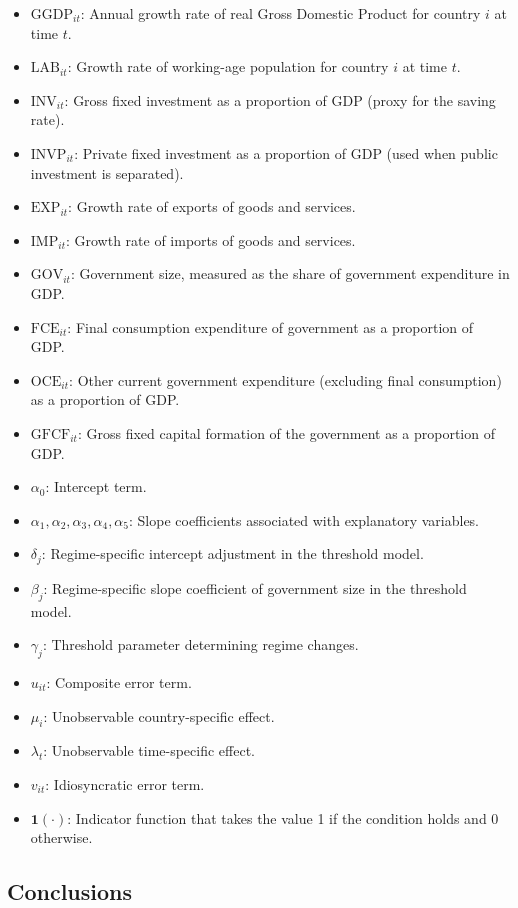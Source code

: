 \documentclass[10pt, oneside]{article}
\begin{document}
\begin{itemize}
	\item $\mathrm{GGDP}_{it}$: Annual growth rate of real Gross Domestic Product for country $i$ at time $t$.
	\item $\mathrm{LAB}_{it}$: Growth rate of working-age population for country $i$ at time $t$.
	\item $\mathrm{INV}_{it}$: Gross fixed investment as a proportion of GDP (proxy for the saving rate).
	\item $\mathrm{INVP}_{it}$: Private fixed investment as a proportion of GDP (used when public investment is separated).
	\item $\mathrm{EXP}_{it}$: Growth rate of exports of goods and services.
	\item $\mathrm{IMP}_{it}$: Growth rate of imports of goods and services.
	\item $\mathrm{GOV}_{it}$: Government size, measured as the share of government expenditure in GDP.
	\item $\mathrm{FCE}_{it}$: Final consumption expenditure of government as a proportion of GDP.
	\item $\mathrm{OCE}_{it}$: Other current government expenditure (excluding final consumption) as a proportion of GDP.
	\item $\mathrm{GFCF}_{it}$: Gross fixed capital formation of the government as a proportion of GDP.
	\item $\alpha_0$: Intercept term.
	\item $\alpha_1, \alpha_2, \alpha_3, \alpha_4, \alpha_5$: Slope coefficients associated with explanatory variables.
	\item $\delta_j$: Regime-specific intercept adjustment in the threshold model.
	\item $\beta_j$: Regime-specific slope coefficient of government size in the threshold model.
	\item $\gamma_j$: Threshold parameter determining regime changes.
	\item $u_{it}$: Composite error term.
	\item $\mu_i$: Unobservable country-specific effect.
	\item $\lambda_t$: Unobservable time-specific effect.
	\item $v_{it}$: Idiosyncratic error term.
	\item $\mathbf{1}(\cdot)$: Indicator function that takes the value 1 if the condition holds and 0 otherwise.
\end{itemize}
\subsection{Conclusions}
\end{document}
